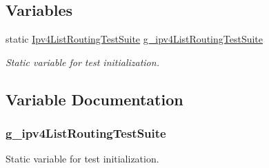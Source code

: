\subsection*{Variables}
\begin{DoxyCompactItemize}
\item 
static \hyperlink{classIpv4ListRoutingTestSuite}{Ipv4\+List\+Routing\+Test\+Suite} \hyperlink{ipv4-list-routing-test-suite_8cc_a3e8272ad3c6cd1d1af5cebdde61004ed}{g\+\_\+ipv4\+List\+Routing\+Test\+Suite}
\begin{DoxyCompactList}\small\item\em Static variable for test initialization. \end{DoxyCompactList}\end{DoxyCompactItemize}


\subsection{Variable Documentation}
\subsubsection[{\texorpdfstring{g\+\_\+ipv4\+List\+Routing\+Test\+Suite}{g_ipv4ListRoutingTestSuite}}]{ g\+\_\+ipv4\+List\+Routing\+Test\+Suite\hspace{0.3cm}{\ttfamily [static]}}\hypertarget{ipv4-list-routing-test-suite_8cc_a3e8272ad3c6cd1d1af5cebdde61004ed}{}\label{ipv4-list-routing-test-suite_8cc_a3e8272ad3c6cd1d1af5cebdde61004ed}


Static variable for test initialization. 

